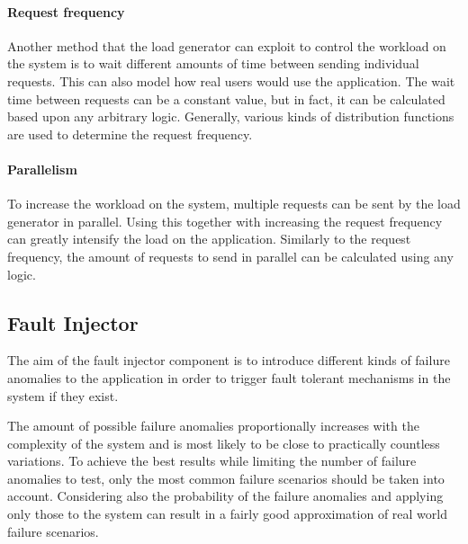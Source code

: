 \paragraph{Request frequency} Another method that the load generator can exploit to control the workload on the system is to wait different amounts of time between sending individual requests. This can also model how real users would use the application. The wait time between requests can be a constant value, but in fact, it can be calculated based upon any arbitrary logic. Generally, various kinds of distribution functions are used to determine the request frequency.

\paragraph{Parallelism} To increase the workload on the system, multiple requests can be sent by the load generator in parallel. Using this together with increasing the request frequency can greatly intensify the load on the application. Similarly to the request frequency, the amount of requests to send in parallel can be calculated using any logic.


\subsection{Fault Injector} \label{test-design-fault-injector}


The aim of the fault injector component is to introduce different kinds of failure anomalies to the application in order to trigger fault tolerant mechanisms in the system if they exist.

The amount of possible failure anomalies proportionally increases with the complexity of the system and is most likely to be close to practically countless variations. To achieve the best results while limiting the number of failure anomalies to test, only the most common failure scenarios should be taken into account. Considering also the probability of the failure anomalies and applying only those to the system can result in a fairly good approximation of real world failure scenarios.

